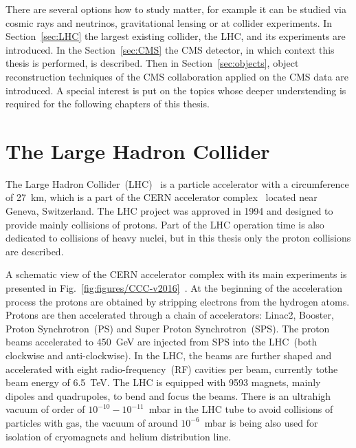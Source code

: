 \clearpage

\setcounter{secnumdepth}{4}
\setcounter{secnumdepth}{5}

There are several options how to study matter, for example it can be studied via cosmic rays and neutrinos, gravitational lensing or at collider experiments. In Section~\ref{sec:LHC} the largest existing collider, the LHC, and its experiments are introduced. In the Section~\ref{sec:CMS} the CMS detector, in which context this thesis is performed, is described. Then in Section~\ref{sec:objects}, object reconstruction techniques of the CMS collaboration applied on the CMS data are introduced. A special interest is put on the topics whose deeper understending is required for the following chapters of this thesis.

\section{The Large Hadron Collider~\label{sec:LHC}}

The Large Hadron Collider~(LHC)~\cite{CERN-Brochure-2017-002-Eng, Evans:2008zzb} is a particle accelerator with a circumference of 27~km, which is a part of the CERN accelerator complex~\cite{Bruning:2004ej} located near Geneva, Switzerland. The LHC project was approved in 1994 and designed to provide mainly collisions of protons. Part of the LHC operation time is also dedicated to collisions of heavy nuclei, but in this thesis only the proton collisions are described.

A schematic view of the CERN accelerator complex with its main experiments is presented in Fig.~\ref{fig:figures/CCC-v2016}~\cite{Mobs:2225847}. At the beginning of the acceleration process the protons are obtained by stripping electrons from the hydrogen atoms. Protons are then accelerated through a chain of accelerators: Linac2, Booster, Proton Synchrotron~(PS) and Super Proton Synchrotron~(SPS). The proton beams accelerated to 450~GeV are injected from SPS into the LHC~(both clockwise and anti-clockwise). In the LHC, the beams are further shaped and accelerated with eight radio-frequency~(RF) cavities per beam, currently tothe beam energy of 6.5~TeV. The LHC is equipped with 9593 magnets, mainly dipoles and quadrupoles, to bend and focus the beams. There is an ultrahigh vacuum of order of $10^{-10}-10^{-11}$~mbar in the LHC tube to avoid collisions of particles with gas, the vacuum of around $10^{-6}$~mbar is being also used for isolation  of cryomagnets and helium distribution line.

